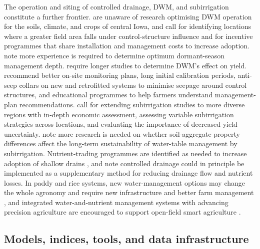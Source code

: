 \documentclass[11pt]{article}
\begin{document}
The operation and siting of controlled drainage, DWM, and subirrigation constitute a further frontier. \textcite{Jaynes2012} are unaware of research optimising DWM operation for the soils, climate, and crops of central Iowa, and call for identifying locations where a greater field area falls under control-structure influence and for incentive programmes that share installation and management costs to increase adoption. \textcite{Adeuya2012} note more experience is required to determine optimum dormant-season management depth. \textcite{Cooke2012} require longer studies to determine DWM's effect on yield. \textcite{Gunn2015} recommend better on-site monitoring plans, long initial calibration periods, anti-seep collars on new and retrofitted systems to minimise seepage around control structures, and educational programmes to help farmers understand management-plan recommendations. \textcite{Gunn2019} call for extending subirrigation studies to more diverse regions with in-depth economic assessment, assessing variable subirrigation strategies across locations, and evaluating the importance of decreased yield uncertainty. \textcite{Baker2004} note more research is needed on whether soil-aggregate property differences affect the long-term sustainability of water-table management by subirrigation. Nutrient-trading programmes are identified as needed to increase adoption of shallow drains \parencite{Ghane2021b}, and \textcite{HernandezRamirez2011} note controlled drainage could in principle be implemented as a supplementary method for reducing drainage flow and nutrient losses. In paddy and rice systems, new water-management options may change the whole agronomy and require new infrastructure and better farm management \parencite{DarziNaftchali2014}, and integrated water-and-nutrient management systems with advancing precision agriculture are encouraged to support open-field smart agriculture \parencite{Jung2024}.

\subsection{Models, indices, tools, and data infrastructure}
\end{document}
